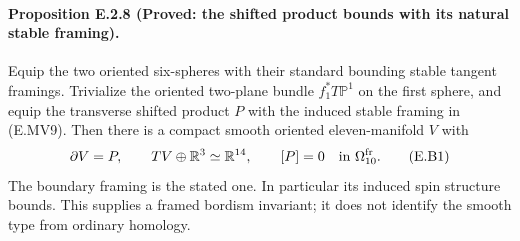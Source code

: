 \paragraph{Proposition E.2.8 (Proved: the shifted product bounds with its natural stable framing).}
Equip the two oriented six-spheres with their standard bounding
stable tangent framings. Trivialize the oriented two-plane bundle
$f_1^*T\mathbb P^1$ on the first sphere, and equip the transverse
shifted product $P$ with the induced stable framing in (E.MV9).
Then there is a compact smooth oriented eleven-manifold $V$ with
\[
 \partial V=P,\qquad TV\oplus\mathbb R^3\simeq\mathbb R^{14},
 \qquad [P]=0\quad\hbox{in }\Omega^{\mathrm{fr}}_{10}.
 \tag{E.B1}
\]
The boundary framing is the stated one. In particular its induced
spin structure bounds. This supplies a framed bordism invariant;
it does not identify the smooth type from ordinary homology.
